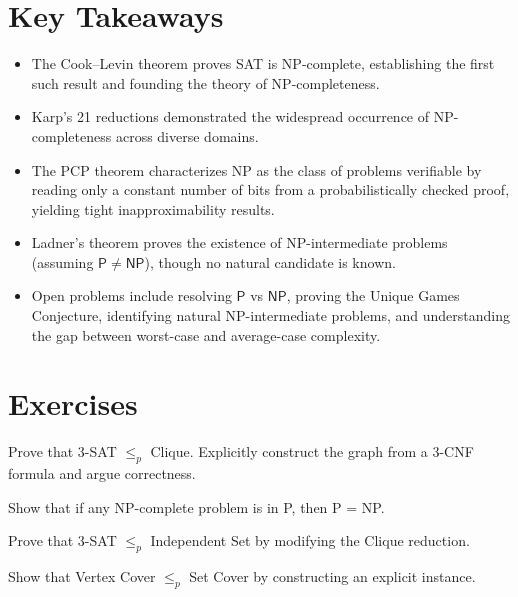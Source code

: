 \section*{Key Takeaways}
\begin{itemize}
\item The Cook--Levin theorem proves SAT is NP-complete, establishing the first such result and founding the theory of NP-completeness.
\item Karp's 21 reductions demonstrated the widespread occurrence of NP-completeness across diverse domains.
\item The PCP theorem characterizes NP as the class of problems verifiable by reading only a constant number of bits from a probabilistically checked proof, yielding tight inapproximability results.
\item Ladner's theorem proves the existence of NP-intermediate problems (assuming $\mathsf{P} \neq \mathsf{NP}$), though no natural candidate is known.
\item Open problems include resolving $\mathsf{P}$ vs $\mathsf{NP}$, proving the Unique Games Conjecture, identifying natural NP-intermediate problems, and understanding the gap between worst-case and average-case complexity.
\end{itemize}

\section{Exercises}
\label{sec:np:exercises}

\begin{exercise}[Basic]
Prove that 3-SAT $\le_p$ Clique. Explicitly construct the graph from a 3-CNF formula and argue correctness.
\end{exercise}

\begin{exercise}[Basic]
Show that if any NP-complete problem is in P, then P = NP.
\end{exercise}

\begin{exercise}[Basic]
Prove that 3-SAT $\le_p$ Independent Set by modifying the Clique reduction.
\end{exercise}

\begin{exercise}[Basic]
Show that Vertex Cover $\le_p$ Set Cover by constructing an explicit instance.
\end{exercise}

